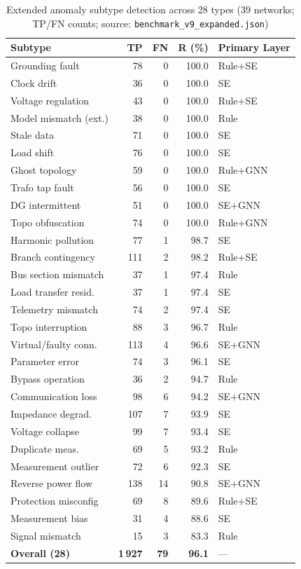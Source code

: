\documentclass[research]{fcs}
\begin{document}
\begin{table}[htbp]
\centering
\caption{Extended anomaly subtype detection across 28 types (39 networks; TP/FN counts; source: \texttt{benchmark\_v9\_expanded.json})}
\label{tab:confusion}
\begin{tabular}{@{}lrrrl@{}}
\toprule
Subtype & TP & FN & R (\%) & Primary Layer \\
\midrule
Grounding fault        & 78 &  0 & 100.0 & Rule+SE \\
Clock drift            & 36 &  0 & 100.0 & SE \\
Voltage regulation     & 43 &  0 & 100.0 & Rule+SE \\
Model mismatch (ext.)  & 38 &  0 & 100.0 & Rule \\
Stale data             & 71 &  0 & 100.0 & SE \\
Load shift             & 76 &  0 & 100.0 & SE \\
Ghost topology         & 59 &  0 & 100.0 & Rule+GNN \\
Trafo tap fault        & 56 &  0 & 100.0 & SE \\
DG intermittent        & 51 &  0 & 100.0 & SE+GNN \\
Topo obfuscation       & 74 &  0 & 100.0 & Rule+GNN \\
Harmonic pollution     & 77 &  1 & 98.7  & SE \\
Branch contingency     &111 &  2 & 98.2  & Rule+SE \\
Bus section mismatch   & 37 &  1 & 97.4  & Rule \\
Load transfer resid.   & 37 &  1 & 97.4  & SE \\
Telemetry mismatch     & 74 &  2 & 97.4  & SE \\
Topo interruption      & 88 &  3 & 96.7  & Rule \\
Virtual/faulty conn.   &113 &  4 & 96.6  & SE+GNN \\
Parameter error        & 74 &  3 & 96.1  & SE \\
Bypass operation       & 36 &  2 & 94.7  & Rule \\
Communication loss     & 98 &  6 & 94.2  & SE+GNN \\
Impedance degrad.      &107 &  7 & 93.9  & SE \\
Voltage collapse       & 99 &  7 & 93.4  & SE \\
Duplicate meas.        & 69 &  5 & 93.2  & Rule \\
Measurement outlier    & 72 &  6 & 92.3  & SE \\
Reverse power flow     &138 & 14 & 90.8  & SE+GNN \\
Protection misconfig   & 69 &  8 & 89.6  & Rule+SE \\
Measurement bias       & 31 &  4 & 88.6  & SE \\
Signal mismatch        & 15 &  3 & 83.3  & Rule \\
\midrule
\textbf{Overall (28)}  &\textbf{1\,927} & \textbf{79} & \textbf{96.1} & --- \\
\bottomrule
\end{tabular}
\end{table}
\end{document}
